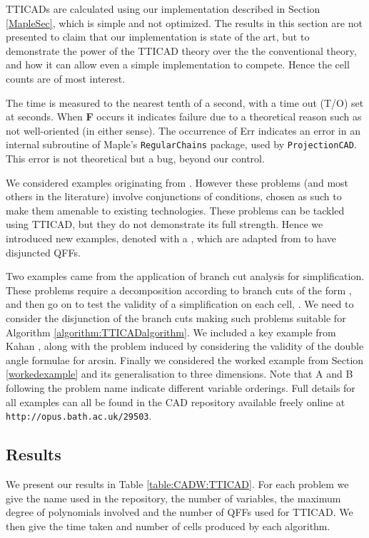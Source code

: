 \documentclass{article}
\begin{document}
TTICADs are calculated using our implementation described in Section \ref{MapleSec}, which is simple and not optimized.  The results in this section are not presented to claim that our implementation is state of the art, but to demonstrate the power of the TTICAD theory over the the conventional theory, and how it can allow even a simple implementation to compete.  Hence the cell counts are of most interest.

The time is measured to the nearest tenth of a second, with a time out (T/O) set at  seconds.   When {\bf F} occurs it indicates failure due to a theoretical reason such as not well-oriented (in either sense).  The occurrence  of Err indicates an error in an internal subroutine of {\sc Maple}'s \texttt{RegularChains} package, used by \texttt{ProjectionCAD}.  This error is not theoretical but a bug, 
beyond our control. 

We considered examples originating from \cite{BuchbergerHong1991}.  However these problems (and most others in the literature) involve conjunctions of conditions, chosen as such to make them amenable to existing technologies.
These problems can be tackled using TTICAD, but they do not demonstrate its full strength. Hence we introduced new examples, denoted with a , which are adapted from \cite{BuchbergerHong1991} to have disjuncted QFFs.

Two examples came from the application of branch cut analysis for simplification.  These problems require a decomposition according to branch cuts of the form , and then go on to test the validity of a simplification on each cell, \cite[etc.]{Phisanbutetal2010a}.  We need to consider the disjunction of the branch cuts making such problems suitable for Algorithm \ref{algorithm:TTICADalgorithm}.  We included a key example from Kahan \cite{Kahan1987b}, along with the problem induced by considering the validity of the double angle formulae for arcsin.  Finally we considered the worked example from Section \ref{workedexample} and its generalisation to three dimensions.
Note that A and B following the problem name indicate different variable orderings.  Full details for all examples can all be found in the CAD repository \cite{Wilsonetal2012b}
available freely online at \texttt{http://opus.bath.ac.uk/29503}.
 
\subsection{Results}

We present our results in Table \ref{table:CADW:TTICAD}.  For each problem we give the name used in the repository,  the number of variables,  the maximum degree of polynomials involved and  the number of QFFs used for TTICAD.  We then give the time taken and number of cells produced by each algorithm.  
\end{document}

